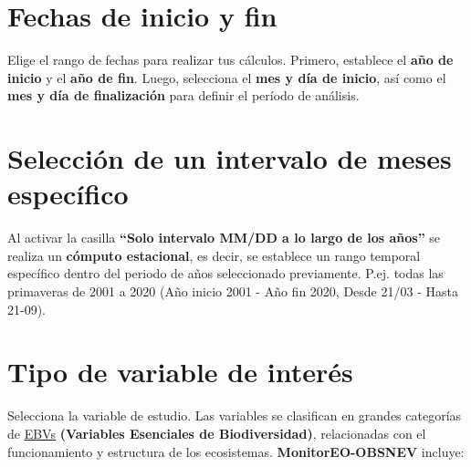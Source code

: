 \documentclass[
]{book}
\begin{document}
\chapter{Fechas de inicio y fin}\label{fechas}

Elige el rango de fechas para realizar tus cálculos. Primero, establece el \textbf{año de inicio} y el \textbf{año de fin}. Luego, selecciona el \textbf{mes y día de inicio}, así como el \textbf{mes y día de finalización} para definir el período de análisis.

\chapter{Selección de un intervalo de meses específico}\label{periodo}

Al activar la casilla \textbf{``Solo intervalo MM/DD a lo largo de los años''} se realiza un \textbf{cómputo estacional}, es decir, se establece un rango temporal específico dentro del periodo de años seleccionado previamente. P.ej. todas las primaveras de 2001 a 2020 (Año inicio 2001 - Año fin 2020, Desde 21/03 - Hasta 21-09).

\chapter{Tipo de variable de interés}\label{tipo-variable}

Selecciona la variable de estudio. Las variables se clasifican en grandes categorías de \href{https://geobon.org/ebvs/what-are-ebvs/}{EBVs} \textbf{(Variables Esenciales de Biodiversidad)}, relacionadas con el funcionamiento y estructura de los ecosistemas. \textbf{MonitorEO-OBSNEV} incluye:
\end{document}
